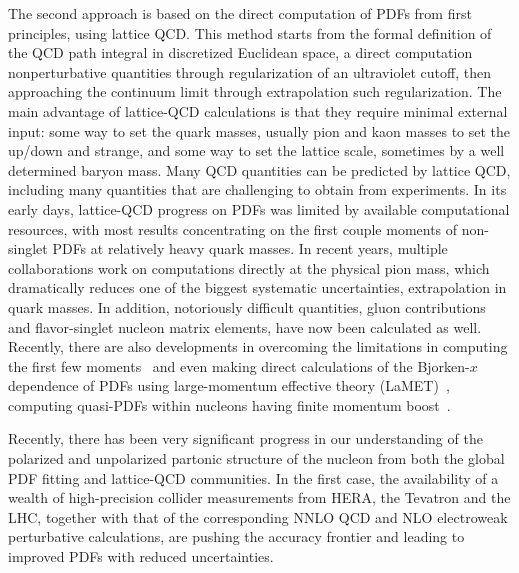 The second approach is based on the direct computation of PDFs from first 
principles, using lattice QCD.
This method starts from the formal definition of the QCD path integral in discretized Euclidean space, 
a direct computation nonperturbative quantities
through regularization of an ultraviolet cutoff, then approaching the continuum limit through extrapolation
such regularization. 
%
The main advantage of lattice-QCD calculations is that they require minimal external input:
some way to set the quark masses, usually pion and kaon masses to set the up/down and strange,
and some way to set the lattice scale, sometimes by a well determined baryon mass. 
Many QCD quantities can be predicted by lattice QCD, including many quantities that are challenging to obtain from experiments. 
In its early days, lattice-QCD progress on PDFs was limited by available computational resources,
with most results concentrating on the first couple moments of non-singlet PDFs at relatively heavy quark masses. 
In recent years, multiple collaborations work on computations directly at the physical pion mass, which 
dramatically reduces one of the biggest systematic uncertainties, extrapolation in quark masses. In addition, notoriously difficult quantities, gluon contributions and flavor-singlet nucleon matrix elements, have now been calculated as well. Recently, there are also developments in overcoming the limitations in computing the first few moments~\cite{Constantinou:2014tga,Syritsyn:2014saa,Lin:2012ev} and even making direct calculations of the Bjorken-$x$ dependence of PDFs using large-momentum effective theory (LaMET)~\cite{Ji:2014gla}, computing quasi-PDFs within nucleons having finite momentum boost~\cite{Lin:2014zya,Alexandrou:2015rja,Chen:2016utp,Alexandrou:2016jqi}.

Recently, there has been very significant progress in our understanding
of the polarized and unpolarized partonic structure of the nucleon from both
the global PDF fitting and lattice-QCD communities.
%
In the first case, the availability of a wealth of high-precision collider measurements
from HERA, the Tevatron and the LHC, together with that of the corresponding
NNLO QCD and NLO electroweak perturbative calculations, are pushing the
accuracy frontier and leading to improved PDFs with reduced uncertainties.


